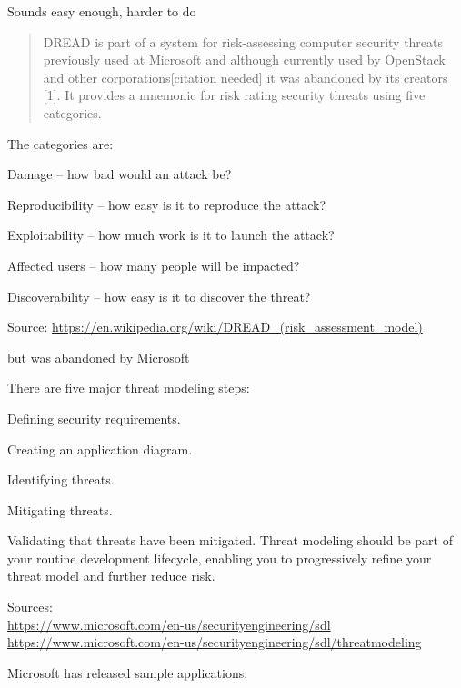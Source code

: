 \documentclass[Screen16to9,17pt]{foils}
\begin{document}
Sounds easy enough, harder to do



\begin{quote}
DREAD is part of a system for risk-assessing computer security threats previously used at Microsoft and although currently used by OpenStack and other corporations[citation needed] it was abandoned by its creators [1]. It provides a mnemonic for risk rating security threats using five categories.
\end{quote}
The categories are:

\begin{list2}
\item Damage – how bad would an attack be?
\item Reproducibility – how easy is it to reproduce the attack?
\item Exploitability – how much work is it to launch the attack?
\item Affected users – how many people will be impacted?
\item Discoverability – how easy is it to discover the threat?
\end{list2}
Source:
\url{https://en.wikipedia.org/wiki/DREAD_(risk_assessment_model)}

but was abandoned by Microsoft


There are five major threat modeling steps:
\begin{list2}
\item Defining security requirements.
\item Creating an application diagram.
\item Identifying threats.
\item Mitigating threats.
\item Validating that threats have been mitigated.
Threat modeling should be part of your routine development lifecycle, enabling you to progressively refine your threat model and further reduce risk.
\end{list2}

Sources:\\
\url{https://www.microsoft.com/en-us/securityengineering/sdl}\\
\url{https://www.microsoft.com/en-us/securityengineering/sdl/threatmodeling}



Microsoft has released sample applications.
\end{document}
